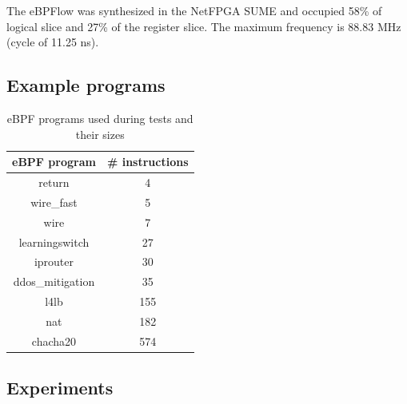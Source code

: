 
The eBPFlow was synthesized in the NetFPGA SUME and occupied 58\% of logical slice and 27\% of the register slice. The maximum frequency is 88.83 MHz (cycle of 11.25 ns).


\subsection{Example programs}

\begin{table}[h]
\centering
\caption{eBPF programs used during tests and their sizes}
\label{tbl:example-sizes}
\begin{tabular}{|c|c|}
\hline
\textbf{eBPF program} & \textbf{\# instructions} \\ \hline
return                & 4                        \\ \hline
wire\_fast            & 5                        \\ \hline
wire                  & 7                        \\ \hline
learningswitch        & 27                       \\ \hline
iprouter              & 30                       \\ \hline
ddos\_mitigation      & 35                       \\ \hline
l4lb                  & 155                      \\ \hline
nat                   & 182                      \\ \hline
chacha20              & 574                      \\ \hline
\end{tabular}
\end{table}

\subsection{Experiments} 
\label{sec:experiments}


